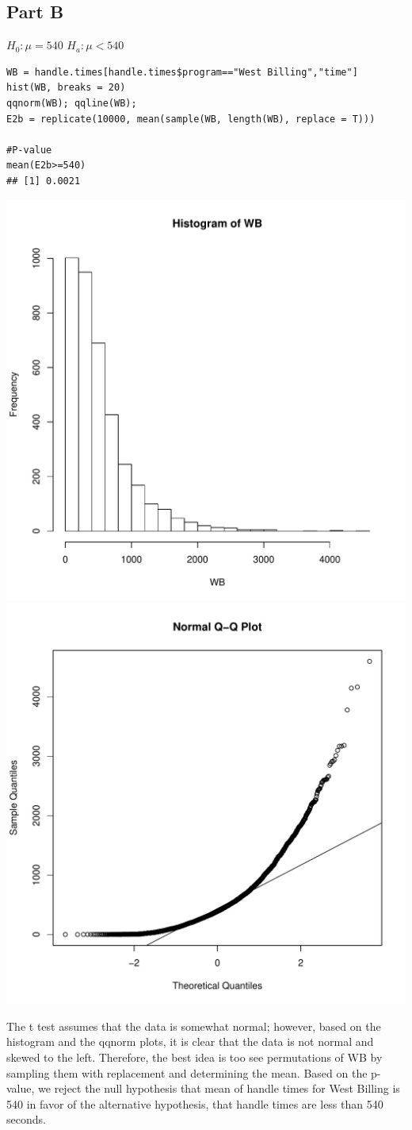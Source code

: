 \documentclass{article}\usepackage[]{graphicx}\usepackage[]{color}
\makeatletter
\newenvironment{kframe}{%
 \def\at@end@of@kframe{}%
 \ifinner\ifhmode%
  \def\at@end@of@kframe{\end{minipage}}%
  \begin{minipage}{\columnwidth}%
 \fi\fi%
 \def\FrameCommand##1{\hskip\@totalleftmargin \hskip-\fboxsep
 \colorbox{shadecolor}{##1}\hskip-\fboxsep
     \hskip-\linewidth \hskip-\@totalleftmargin \hskip\columnwidth}%
 \MakeFramed {\advance\hsize-\width
   \@totalleftmargin\z@ \linewidth\hsize
   \@setminipage}}%
 {\par\unskip\endMakeFramed%
 \at@end@of@kframe}
\newenvironment{knitrout}{}{} %
\makeatother
\begin{document}
\subsection*{Part B}
$H_{0}:\mu=540$
$H_{a}:\mu<540$
\begin{knitrout}
\color{fgcolor}\begin{kframe}
\begin{verbatim}
WB = handle.times[handle.times$program=="West Billing","time"]
hist(WB, breaks = 20)
qqnorm(WB); qqline(WB);
E2b = replicate(10000, mean(sample(WB, length(WB), replace = T)))

#P-value
mean(E2b>=540)
## [1] 0.0021
\end{verbatim}
\end{kframe}
\includegraphics[width=0.33\linewidth]{figure/unnamed-chunk-5-1} 
\includegraphics[width=0.33\linewidth]{figure/unnamed-chunk-5-2} 

\end{knitrout}
The t test assumes that the data is somewhat normal; however, based on the histogram and the qqnorm plots, it is clear that the data is not normal and skewed to the left. Therefore, the best idea is too see permutations of WB by sampling them with replacement and determining the mean. Based on the p-value, we reject the null hypothesis that mean of handle times for West Billing is 540 in favor of the alternative hypothesis, that handle times are less than 540 seconds.  
\end{document}
